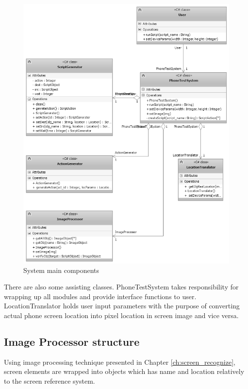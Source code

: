 	\begin{figure}[H]
		\centering
		\includegraphics[scale=0.75]{Chapters/Fig/main_class.png}
		\caption{System main components}
		\label{fig:main_class}
	\end{figure}

There are also some assisting classes. PhoneTestSystem takes responsibility for wrapping up all modules and provide interface functions to user. LocationTranslator holds user input parameters with the purpose of converting actual phone screen location into pixel location in screen image and vice versa.

\subsection{Image Processor structure}
Using image processing technique presented in Chapter \ref{ch:screen_recognize}, screen elements are wrapped into objects which has name and location relatively to the screen reference system.

